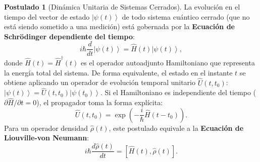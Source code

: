\documentclass[11pt,a4paper,twoside]{report}
\theoremstyle{definition}
\newtheorem{postulado}{Postulado}[chapter]
\theoremstyle{plain}
\theoremstyle{remark}
\newcommand{\ket}[1]{\left| #1 \right\rangle}
\newcommand{\comm}[2]{\left[ #1, #2 \right]}
\newcommand{\op}[1]{\hat{#1}}
\begin{document}
\begin{postulado}[Dinámica Unitaria de Sistemas Cerrados]
La evolución en el tiempo del vector de estado $\ket{\psi(t)}$ de todo sistema cuántico cerrado (que no está siendo sometido a una medición) está gobernada por la \textbf{Ecuación de Schrödinger dependiente del tiempo}:
\begin{equation}
    i\hbar \frac{d}{dt}\ket{\psi(t)} = \op{H}(t)\ket{\psi(t)},
\end{equation}
donde $\op{H}(t) = \op{H}^\dagger(t)$ es el operador autoadjunto Hamiltoniano que representa la energía total del sistema. De forma equivalente, el estado en el instante $t$ se obtiene aplicando un operador de evolución temporal unitario $\op{U}(t, t_0)$: $\ket{\psi(t)} = \op{U}(t, t_0)\ket{\psi(t_0)}$. Si el Hamiltoniano es independiente del tiempo ($\partial\op{H}/\partial t = 0$), el propagador toma la forma explícita:
\begin{equation}
    \op{U}(t, t_0) = \exp\left( -\frac{i}{\hbar}\op{H}(t - t_0) \right).
\end{equation}
Para un operador densidad $\op{\rho}(t)$, este postulado equivale a la \textbf{Ecuación de Liouville-von Neumann}:
\begin{equation}
    i\hbar \frac{d\op{\rho}(t)}{dt} = \comm{\op{H}(t)}{\op{\rho}(t)}.
\end{equation}
\end{postulado}
\end{document}
